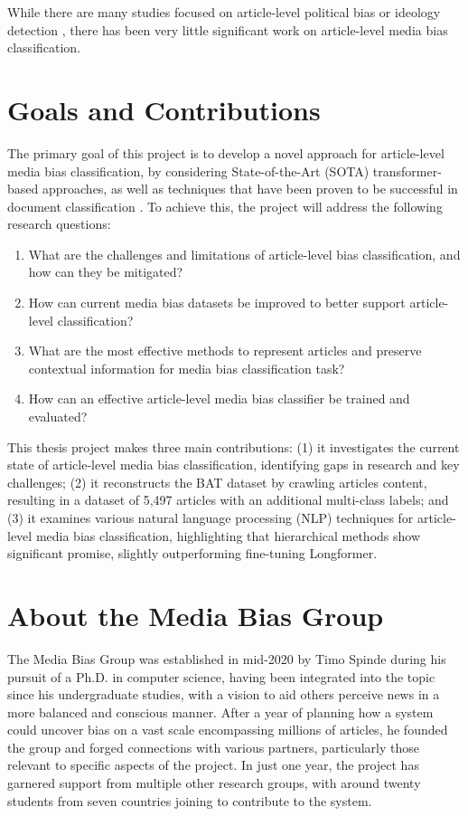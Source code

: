 While there are many studies focused on article-level political bias or ideology detection \cite{kulkarni-2018-multi-view,baly-2020-we-can-detect-your-bias,baly-2019-mt}, there has been very little significant work on article-level media bias classification.

\section{Goals and Contributions}

The primary goal of this project is to develop a novel approach for article-level media bias classification, by considering State-of-the-Art (SOTA) transformer-based approaches, as well as techniques that have been proven to be successful in document classification \cite{su-2021-classifying,wan-2019-long-length,park-2022-efficient,pappagari-2019-hierarchical}. To achieve this, the project will address the following research questions:
\begin{enumerate}
    \item What are the challenges and limitations of article-level bias classification, and how can they be mitigated?
    \item How can current media bias datasets be improved to better support article-level classification?
    \item What are the most effective methods to represent articles and preserve contextual information for media bias classification task?
    \item How can an effective article-level media bias classifier be trained and evaluated?
\end{enumerate}

This thesis project makes three main contributions: (1) it investigates the current state of article-level media bias classification, identifying gaps in research and key challenges; (2) it reconstructs the BAT dataset by crawling articles content, resulting in a dataset of 5,497 articles with an additional multi-class labels; and (3) it examines various natural language processing (NLP) techniques for article-level media bias classification, highlighting that hierarchical methods show significant promise, slightly outperforming fine-tuning Longformer.

\section{About the Media Bias Group}

The Media Bias Group \cite{media-bias-group} was established in mid-2020 by Timo Spinde during his pursuit of a Ph.D. in computer science, having been integrated into the topic since his undergraduate studies, with a vision to aid others perceive news in a more balanced and conscious manner. After a year of planning how a system could uncover bias on a vast scale encompassing millions of articles, he founded the group and forged connections with various partners, particularly those relevant to specific aspects of the project. In just one year, the project has garnered support from multiple other research groups, with around twenty students from seven countries joining to contribute to the system.

